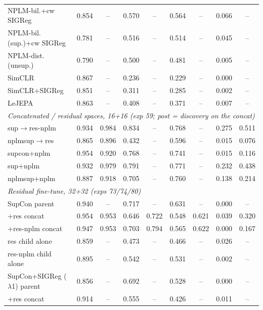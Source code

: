 \begin{landscape}
\begin{center}
\begin{longtable}{lcccccccc}
\quad NPLM-bil.+cw SIGReg & 0.854 & -- & 0.570 & -- & 0.564 & -- & 0.066 & -- \\
\quad NPLM-bil.(sup.)+cw SIGReg & 0.781 & -- & 0.516 & -- & 0.514 & -- & 0.045 & -- \\
\quad NPLM-dist. (unsup.) & 0.790 & -- & 0.500 & -- & 0.481 & -- & 0.005 & -- \\
\quad SimCLR & 0.867 & -- & 0.236 & -- & 0.229 & -- & 0.000 & -- \\
\quad SimCLR+SIGReg & 0.851 & -- & 0.311 & -- & 0.285 & -- & 0.002 & -- \\
\quad LeJEPA & 0.863 & -- & 0.408 & -- & 0.371 & -- & 0.007 & -- \\
\multicolumn{9}{l}{\emph{Concatenated / residual spaces, 16+16 (exp 59; post = discovery on the concat)}} \\
\quad sup$\to$res-nplm & 0.934 & 0.984 & 0.834 & -- & 0.768 & -- & 0.275 & 0.511 \\
\quad nplmsup$\to$res & 0.865 & 0.896 & 0.432 & -- & 0.596 & -- & 0.015 & 0.076 \\
\quad supcon+nplm & 0.954 & 0.920 & 0.768 & -- & 0.741 & -- & 0.015 & 0.116 \\
\quad sup+nplm & 0.932 & 0.979 & 0.791 & -- & 0.771 & -- & 0.232 & 0.438 \\
\quad nplmsup+nplm & 0.887 & 0.918 & 0.705 & -- & 0.760 & -- & 0.138 & 0.214 \\
\multicolumn{9}{l}{\emph{Residual fine-tune, 32+32 (exps 73/74/80)}} \\
\quad SupCon parent & 0.940 & -- & 0.717 & -- & 0.631 & -- & 0.000 & -- \\
\quad\quad +res concat & 0.954 & 0.953 & 0.646 & 0.722 & 0.548 & 0.621 & 0.039 & 0.320 \\
\quad\quad +res-nplm concat & 0.947 & 0.953 & 0.703 & 0.794 & 0.565 & 0.622 & 0.000 & 0.167 \\
\quad\quad res child alone & 0.859 & -- & 0.473 & -- & 0.466 & -- & 0.026 & -- \\
\quad\quad res-nplm child alone & 0.895 & -- & 0.542 & -- & 0.531 & -- & 0.002 & -- \\
\quad SupCon+SIGReg ($\lambda$1) parent & 0.856 & -- & 0.692 & -- & 0.528 & -- & 0.000 & -- \\
\quad\quad +res concat & 0.914 & -- & 0.555 & -- & 0.426 & -- & 0.011 & -- \\
\end{longtable}
\end{center}
\end{landscape}
